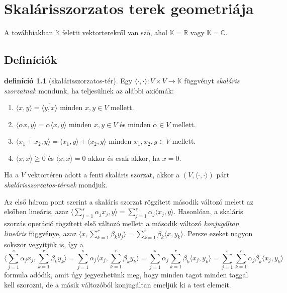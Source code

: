 \documentclass[9pt, a4paper, showtrims]{memoir}
\theoremstyle{plain}
\theoremstyle{remark}
\theoremstyle{definition}
\newtheorem{definition}[proposition]{definíció}
\newcommand{\ip}[2]{\langle#1,#2\rangle}
\begin{document}
\chapter{Skalárisszorzatos terek geometriája}
A továbbiakban $\mathbb{K}$ feletti vektorterekről van szó,
ahol $\mathbb{K}=\mathbb{R}$ vagy $\mathbb{K}=\mathbb{C}$.
\section{Definíciók}

\begin{definition}[skalárisszorzatos-tér]
	Egy $\ip{\cdot}{\cdot}:V\times V\to \mathbb{K}$ függvényt \emph{skaláris szorzatnak} mondunk, ha
	teljesülnek az alábbi axiómák:
	\begin{enumerate}
		\item $\ip{x}{y}=\overline{\ip{y}{x}}$ minden $x,y\in V$ mellett.
		\item
		      $\ip{\alpha x}{y}=
			      \alpha\ip{x}{y}$ minden $x,y\in V$ és minden $\alpha\in V$ mellett.
		\item
		      $\ip{x_1+x_2}{y}=
			      \ip{x_1}{y}+\ip{x_2}{y}$ minden $x_1,x_2,y\in V$ mellett.
		\item
		      $\ip{x}{x}\geq 0$ és $\ip{x}{x}=0$ akkor és csak akkor, ha $x=0$.
	\end{enumerate}
	Ha a $V$ vektortéren adott a fenti skaláris szorzat,
	akkor a $\left( V,\ip{\cdot}{\cdot} \right)$ párt \emph{skalárisszorzatos-térnek} mondjuk.
\end{definition}
Az első három pont szerint a skaláris szorzat rögzített második változó melett az elsőben lineáris, azaz
$
	\ip{\sum_{j=1}^s\alpha_jx_j}{y}
	=
	\sum_{j=1}^s\alpha_j\ip{x_j}{y}$.
Hasonlóan, a skaláris szorzás operáció rögzített első változó mellett a második változó
\emph{konjugáltan lineáris} függvénye,
azaz
\begin{math}
	\ip{x}{\sum_{k=1}^r\beta_ky_j}
	=
	\sum_{k=1}^r\overline{\beta_k}\ip{x}{y_k}.
\end{math}
Persze ezeket nagyon sokszor vegyítjük is,
így a
\[
	\ip{\sum_{j=1}^s\alpha_jx_j}{\sum_{k=1}^r\beta_ky_k}
	=
	\sum_{j=1}^s\alpha_j\ip{x_j}{\sum_{k=1}^r\beta_ky_k}
	=
	\sum_{j=1}^s\alpha_j\sum_{k=1}^r\overline{\beta_k}\ip{x_j}{y_k}
	=
	\sum_{j=1}^s\sum_{k=1}^r\alpha_j\overline{\beta_k}\ip{x_j}{y_k}
\]
formula adódik, amit úgy jegyezhetünk meg, hogy minden tagot minden taggal kell szorozni,
de a másik változóból konjugáltan emeljük ki a test elemeit.
\end{document}
